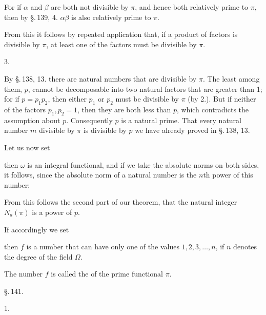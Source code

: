 
For if $\alpha$ and $\beta$ are both not divisible by $\pi$, and hence both relatively prime to $\pi$, then by \S.\,139, 4. $\alpha \beta$ is also relatively prime to $\pi$.

From this it follows by repeated application that, if a product of  factors is divisible by $\pi$, at least one of the factors must be divisible by $\pi$.

3. 

By \S.\,138, 13. there are natural numbers that are divisible by $\pi$. The least among them, $p$, cannot be decomposable into two natural factors that are greater than 1; for if $p = p_1 p_2$, then either $p_1$ or $p_2$ must be divisible by $\pi$ (by 2.). But if neither of the factors $p_1, p_2 = 1$, then they are both less than $p$, which contradicts the assumption about $p$. Consequently $p$ is a natural prime. That every natural number $m$ divisible by $\pi$ is divisible by $p$ we have already proved in \S.\,138, 13.

Let us now set


then $\omega$ is an integral functional, and if we take the absolute norms on both sides, it follows, since the absolute norm of a natural number is the $n$th power of this number:


From this follows the second part of our theorem, that the natural integer $N_a (\pi)$ is a power of $p$.

If accordingly we set


then $f$ is a number that can have only one of the values $1, 2, 3, \dots, n$, if $n$ denotes the degree of the field $\Omega$.

The number $f$ is called the  of the prime functional $\pi$.

\begin{center}
\S.\,141.

\end{center}

1. 
